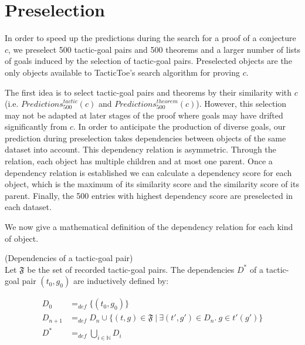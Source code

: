 \documentclass[runningheads,a4paper,draft]{svjour3}
\def\tactictoe{\textsf{TacticToe}\xspace}
\begin{document}
\section{Preselection}\label{sec:presel}

In order to speed up the predictions during the search for a proof of a
conjecture $c$, we preselect 500 tactic-goal pairs and 500 theorems and a
larger number of lists of goals induced by the selection of tactic-goal pairs.
Preselected objects are the only objects available to \tactictoe's search
algorithm for proving $c$.


The first idea is to select tactic-goal pairs and theorems by their similarity
with $c$ (i.e. $\mathit{Predictions}^{\mathit{tactic}}_{500} (c)$ and
$\mathit{Predictions}^{\mathit{theorem}}_{500} (c)$).
However, this selection may not be adapted at later stages of
the proof where goals may have drifted significantly from $c$. In order to
anticipate the production of diverse goals, our prediction during preselection
takes dependencies between objects of the same dataset into account.
This dependency relation is asymmetric. Through the relation, each object has
multiple children and at most one parent.
Once a dependency relation is established we can calculate a dependency score
for each object, which is the maximum of its similarity score
and the similarity score of its parent. Finally, the 500 entries with
highest dependency score are preselected in each dataset.

We now give a mathematical definition of the dependency relation for each kind
of object.

\begin{definition}(Dependencies of a tactic-goal pair)\\
Let $\mathfrak{F}$ be the set of recorded tactic-goal pairs.
The dependencies $D^*$ of a tactic-goal pair $(t_0,g_0)$ are
inductively defined by:

\begin{align*}
D_0 &=_{def} \lbrace (t_0,g_0) \rbrace \\
D_{n+1} &=_{def} D_n \cup \lbrace (t,g)\in \mathfrak{F}\  |\ \exists
(t',g') \in D_n.\ g \in t'(g') \rbrace  \\
D^* &=_{def} \bigcup_{i \in \mathbb{N}} D_i\\
\end{align*}
\end{definition}
\end{document}
